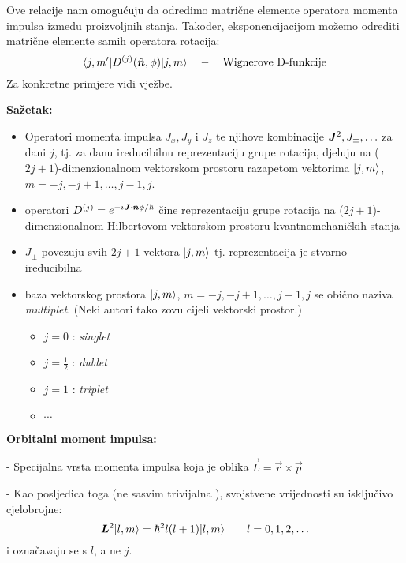 Ove relacije nam omogućuju da odredimo matrične elemente operatora
momenta impulsa između proizvoljnih stanja. Također, eksponencijacijom
možemo odrediti matrične elemente samih operatora rotacija:
\begin{displaymath}
    \bra{j,m'} D^{(j)}(\hat{\vec{n}},\phi) \ket{j, m} \quad - \quad
\text{Wignerove D-funkcije}
\end{displaymath}
Za konkretne primjere vidi vježbe.

\textbf{Sažetak:}

\begin{itemize}
\item  Operatori momenta impulsa $J_x, J_y$ i $J_z$ te njihove kombinacije
$\jsq, J_\pm, \ldots$ za dani $j$, tj. za danu ireducibilnu reprezentaciju
grupe rotacija, djeluju na ($2j+1$)-dimenzionalnom vektorskom prostoru
razapetom vektorima $| j, m \rangle$, $m=-j, -j+1, \ldots, j-1, j$.

\item operatori $D^{(j)}=e^{-i \vec{J}\cdot\unitn\phi/\hbar}$ čine
  reprezentaciju grupe rotacija na ($2j+1$)-dimenzionalnom  Hilbertovom
  vektorskom prostoru kvantnomehaničkih stanja

\item $J_{\pm}$ povezuju svih $2j+1$ vektora $| j, m \rangle$ tj.
  reprezentacija je stvarno ireducibilna

\item baza vektorskog prostora $| j, m \rangle$, $m=-j, -j+1, \ldots, j-1, j$ 
 se obično naziva \emph{multiplet}. (Neki autori tako zovu cijeli
 vektorski prostor.)
  \begin{itemize}
\item  $j=0$ : \emph{singlet}
\item  $j=\frac{1}{2}$ : \emph{dublet}
\item  $j=1$ : \emph{triplet}
\item  $\cdots$ 
\end{itemize}
\end{itemize}

\textbf{Orbitalni moment impulsa:}

- Specijalna vrsta momenta impulsa koja je oblika $\vec{L} = \vec{r}
  \times \vec{p}$

- Kao posljedica toga (ne sasvim trivijalna ), svojstvene vrijednosti su 
 isključivo  cjelobrojne:
\begin{displaymath}
     \vec{L}^2 \ket{l, m} = \hbar^2 l(l+1) \ket{l,m} \qquad l=0,1,2,\ldots
\end{displaymath}
i označavaju se s $l$, a ne $j$.

